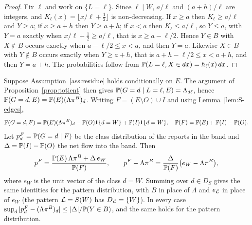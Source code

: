 \begin{proof}
Fix $\ell$ and work on $\{L=\ell\}$. Since $\ell\mid W$, $a/\ell$ and $(a+h)/\ell$ are integers, and $K_\ell(x)=\lfloor x/\ell+\tfrac12\rfloor$ is non-decreasing. If $x\ge a$ then $K_\ell\ge a/\ell$ and $Y\ge a$; if $x\ge a+h$ then $Y\ge a+h$; if $x<a$ then $K_\ell\le a/\ell$, so $Y\le a$, with $Y=a$ exactly when $x/\ell+\tfrac12\ge a/\ell$, that is $x\ge a-\ell/2$. Hence $Y\in B$ with $X\notin B$ occurs exactly when $a-\ell/2\le x<a$, and then $Y=a$. Likewise $X\in B$ with $Y\notin B$ occurs exactly when $Y\ge a+h$, that is $a+h-\ell/2\le x<a+h$, and then $Y=a+h$. The probabilities follow from $\mathbb{P}(L=\ell,X\in dx)=h_\ell(x)\,dx$.
\end{proof}

Suppose Assumption~\ref{ass:residue} holds conditionally on $E$. The argument of Proposition~\ref{prop:totient} then gives $\mathbb{P}(G=d\mid L=\ell,E)=\Lambda_{d\ell}$, hence $\mathbb{P}(G=d,E)=\mathbb{P}(E)(\Lambda\pi^B)_d$. Writing $F=(E\setminus O)\cup I$ and using Lemma~\ref{lem:S-edges},
\[
\mathbb{P}(G=d,F)=\mathbb{P}(E)(\Lambda\pi^B)_d-\mathbb{P}(O)\mathbf 1\{d=W\}+\mathbb{P}(I)\mathbf 1\{d=W\},
\quad
\mathbb{P}(F)=\mathbb{P}(E)+\mathbb{P}(I)-\mathbb{P}(O).
\]
Let $p^F_d=\mathbb{P}(G=d\mid F)$ be the class distribution of the reports in the band and $\Delta=\mathbb{P}(I)-\mathbb{P}(O)$ the net flow into the band. Then
\begin{equation}\label{eq:S-band-exact}
p^F=\frac{\mathbb{P}(E)\,\Lambda\pi^B+\Delta\,e_W}{\mathbb{P}(F)},\qquad
p^F-\Lambda\pi^B=\frac{\Delta}{\mathbb{P}(F)}\bigl(e_W-\Lambda\pi^B\bigr),
\end{equation}
where $e_W$ is the unit vector of the class $d=W$. Summing over $d\in D_S$ gives the same identities for the pattern distribution, with $B$ in place of $\Lambda$ and $e_{\mathcal{L}}$ in place of $e_W$ (the pattern $\mathcal{L}=S(W)$ has $D_{\mathcal{L}}=\{W\}$). In every case $\sup_d|p^F_d-(\Lambda\pi^B)_d|\le|\Delta|/\mathbb{P}(Y\in B)$, and the same holds for the pattern distribution.

